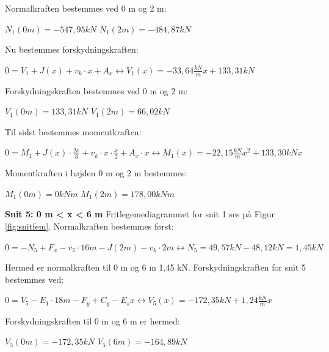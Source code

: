Normalkraften bestemmes ved 0 m og 2 m:
\begin{center}
	$N_1(0m) = -547,\!95 kN$
	\newline
	$N_1(2m) = -484,\!87 kN$
\end{center}

Nu bestemmes forskydningskraften:
\begin{center}
	$0 = V_1 + J(x) + v_k \cdot x + A_x \leftrightarrow V_1(x) = -33,\!64\frac{kN}{m} x + 133,\!31 kN$
\end{center}

Forskydningskraften bestemmes ved 0 m og 2 m:
\begin{center}
	$V_1(0m) = 133,\!31 kN$
	\newline
	$V_1(2m) = 66,\!02 kN$
\end{center}

Til sidst bestemmes momentkraften:
\begin{center}
	$0 = M_1 + J(x) \cdot \frac{2x}{3} + v_k \cdot x \cdot \frac{x}{2} + A_x \cdot x \leftrightarrow M_1(x) = -22,\!15\frac{kN}{m} x^2 + 133,\!30kN x$
\end{center}

Momentkraften i højden 0 m og 2 m bestemmes:
\begin{center}
	$M_1(0m) = 0 kNm$
	\newline
	$M_1(2m) = 178,\!00 kNm$
\end{center}

\textbf{Snit 5: 0 m < x < 6 m}
\newline
Fritlegemediagrammet for snit 1 ses på Figur \ref{fig:snitfem}.
\newline
\newline
Normalkraften bestemmes først:
\begin{center}
	$0 = -N_5 + F_x - v_2 \cdot 16m - J(2m) - v_k \cdot 2m \leftrightarrow N_5 = 49,\!57 kN - 48,\!12 kN = 1,\!45 kN$
\end{center}

Hermed er normalkraften til 0 m og 6 m 1,45 kN. 
\newline
\newline
Forskydningskraften for snit 5 bestemmes ved:
\begin{center}
	$0 = V_5 - E_1 \cdot 18 m - F_y + C_y - E_s x \leftrightarrow V_5(x) = -172,\!35 kN + 1,\!24 \frac{kN}{m}x$
\end{center}

Forskydningskraften til 0 m og 6 m er hermed:
\begin{center}
	$V_5(0m) = -172,\!35 kN$
	\newline
	$V_5(6m) = -164,\!89 kN$
\end{center}

